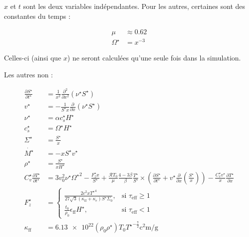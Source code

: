 $x$ et $t$ sont les deux variables indépendantes. Pour les autres, certaines sont des constantes du temps :

\begin{subequations}
    \begin{align}
        \mu &\approx 0.62 \\
        \Omega^\star &= x^{-3}
    \end{align}
\end{subequations}

Celles-ci (ainsi que $x$) ne seront calculées qu’une seule fois dans la simulation.

Les autres non :

\begin{subequations}
    \begin{align}
        \frac{\partial S^\star}{\partial t^\star} &= \frac{1}{x^2} \frac{\partial^2}{\partial x^2} \left(\nu^\star S^\star\right) \label{eq:difS}\\
        v^\star &= - \frac{1}{S^\star x} \frac{\partial}{\partial x} \left(\nu^\star S^\star\right)\label{eq:difv} \\
        \nu^\star &= \alpha c_s^\star H^\star \\
        c_s^\star &= \Omega^\star H^\star \\
        \Sigma^\star &= \frac{S^\star}{x} \\
        \dot{M^\star} &= - x S^\star v^\star \label{eq:Mdotstar}\\
        \rho^\star &= \frac{S^\star}{x H^\star} \\
        C_v^\star \frac{\partial T^{\star}}{\partial t^{\star}} &=
        3 v_0^2 \nu^\star {\Omega^\star}^2 - \frac{F_z^\star x}{S^\star} +
        \frac{\mathcal{R} T_0}{\mu} \frac{4-3\beta}{\beta} \frac{T^\star}{S^\star} \times
        \left( \frac{\partial S^\star}{\partial t^\star} + v^\star \frac{\partial}{\partial x} \left(\frac{S^\star}{x}\right) \right) -
        \frac{C_v^\star v^\star}{x} \frac{\partial T^\star}{\partial x}\label{eq:difT} \\
        F_z^\star &=
        \begin{cases}
            \frac{2 c^2 x {T^\star}^4}{27 \sqrt{3} (\kappa_\mathrm{ff} + \kappa_e) S^\star \Sigma_0}, &\text{si $\tau_\mathrm{eff} \geq 1$} \\
            \frac{t_0}{\rho_0}\epsilon_\mathrm{ff} H^\star, &\text{si $\tau_\mathrm{eff} < 1$}
        \end{cases} \\
        \kappa_\mathrm{ff} &= \num{6.13e22} (\rho_0 \rho^\star) {T_0 T^\star}^{-\frac{7}{2}} \si{\square\centi\meter\per\gram} \\

\end{align}
\end{subequations}
